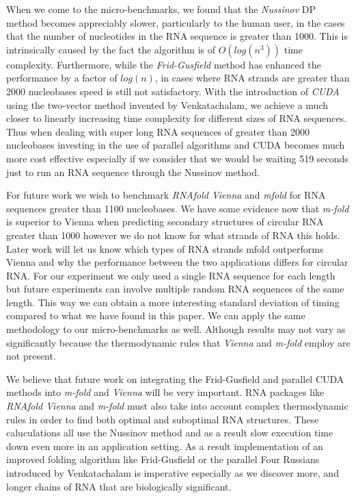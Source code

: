 \documentclass[12pt]{article}
\begin{document}
\par When we come to the micro-benchmarks, we found that the \textit{Nussinov} DP method becomes
appreciably slower, particularly to the human user, in the cases that the number of nucleotides in the RNA sequence is
greater than 1000. This is intrinsically caused by the fact the algorithm is of $O(log(n^3))$ time complexity.
Furthermore, while the \textit{Frid-Gusfield} method \cite{gusfield} has enhanced the performance by a factor of $log(n)$,
in cases where RNA strands are greater than 2000 nucleobases speed is still not satisfactory. With the introduction
of \textit{CUDA} using the two-vector method invented by Venkatachalam\cite{balaji}, we achieve a much closer
to linearly increasing time complexity for different sizes of RNA sequences. Thus when dealing with super long RNA
sequences of greater than 2000 nucleobases investing in the use of parallel algorithms and CUDA becomes much
more cost effective especially if we consider that we would be waiting 519 seconds just to run an RNA sequence
through the Nussinov method.

\par For future work we wish to benchmark \textit{RNAfold Vienna} and \textit{mfold} for RNA sequences
greater than 1100 nucleobases. We have some evidence now that \textit{m-fold} is superior to Vienna when
predicting secondary structures of circular RNA greater than 1000 however we do not know for what strands
of RNA this holds. Later work will let us know which types of RNA strands mfold outperforms Vienna and why
the performance between the two applications differs for circular RNA. For our experiment we only
used a single RNA sequence for each length but future experiments can involve multiple random RNA sequences
of the same length. This way we can obtain a more interesting standard deviation of timing compared to what
we have found in this paper. We can apply the same methodology to our micro-benchmarks as well. Although results may not vary as significantly because the thermodynamic rules that \textit{Vienna} and \textit{m-fold}
employ are not present.

\par We believe that future work on integrating the Frid-Gusfield and parallel CUDA methods into \textit{m-fold} and \textit{Vienna} will be very important. RNA packages like \textit{RNAfold Vienna} and \textit{m-fold} must also
take into account complex thermodynamic rules in order to find both optimal and suboptimal RNA structures. These
caluculations all use the Nussinov method and as a result slow execution time down even more in an
application setting. As a result implementation of an improved folding algorithm like Frid-Gusfield
or the parallel Four Russians introduced by Venkatachalam is imperative especially as we discover more,
and longer chains of RNA that are biologically significant.
\end{document}
